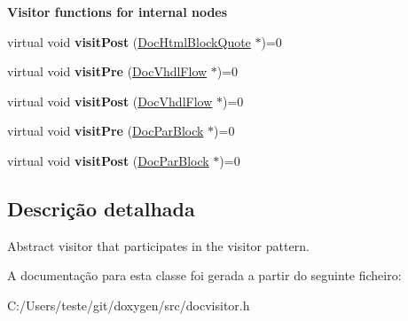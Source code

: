 \begin{Indent}{\bf Visitor functions for internal nodes}
\begin{DoxyCompactItemize}
\item 
\hypertarget{class_doc_visitor_ac1ca00674093440402ea008e528a1e42}{virtual void {\bfseries visit\-Post} (\hyperlink{class_doc_html_block_quote}{Doc\-Html\-Block\-Quote} $\ast$)=0}\label{class_doc_visitor_ac1ca00674093440402ea008e528a1e42}

\item 
\hypertarget{class_doc_visitor_a1b14a39a51ed2c44e8ff823bbc996b5c}{virtual void {\bfseries visit\-Pre} (\hyperlink{class_doc_vhdl_flow}{Doc\-Vhdl\-Flow} $\ast$)=0}\label{class_doc_visitor_a1b14a39a51ed2c44e8ff823bbc996b5c}

\item 
\hypertarget{class_doc_visitor_a86f06904a68599cb9d75f4b67faf5879}{virtual void {\bfseries visit\-Post} (\hyperlink{class_doc_vhdl_flow}{Doc\-Vhdl\-Flow} $\ast$)=0}\label{class_doc_visitor_a86f06904a68599cb9d75f4b67faf5879}

\item 
\hypertarget{class_doc_visitor_a8c2703ad4001f82bd8b3977e9ea2349e}{virtual void {\bfseries visit\-Pre} (\hyperlink{class_doc_par_block}{Doc\-Par\-Block} $\ast$)=0}\label{class_doc_visitor_a8c2703ad4001f82bd8b3977e9ea2349e}

\item 
\hypertarget{class_doc_visitor_a2ee919f6eab841312b6a7a5e887bb846}{virtual void {\bfseries visit\-Post} (\hyperlink{class_doc_par_block}{Doc\-Par\-Block} $\ast$)=0}\label{class_doc_visitor_a2ee919f6eab841312b6a7a5e887bb846}

\end{DoxyCompactItemize}
\end{Indent}


\subsection{Descrição detalhada}
Abstract visitor that participates in the visitor pattern. 

A documentação para esta classe foi gerada a partir do seguinte ficheiro\-:\begin{DoxyCompactItemize}
\item 
C\-:/\-Users/teste/git/doxygen/src/docvisitor.\-h\end{DoxyCompactItemize}
